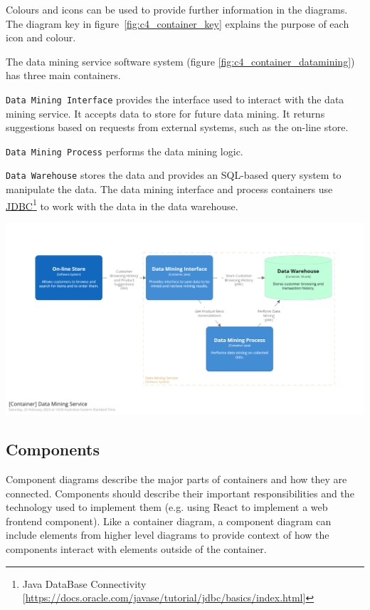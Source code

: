 Colours and icons can be used to provide further information in the diagrams.
The diagram key in figure~\ref{fig:c4_container_key} explains the purpose of each icon and colour.

The data mining service software system (figure \ref{fig:c4_container_datamining}) has three main containers.

\texttt{Data Mining Interface} provides the interface used to interact with the data mining service.
It accepts data to store for future data mining.
It returns suggestions based on requests from external systems, such as the on-line store.

\texttt{Data Mining Process} performs the data mining logic.

\texttt{Data Warehouse} stores the data and provides an SQL-based query system to manipulate the data.
The data mining interface and process containers use
\href{https://docs.oracle.com/javase/tutorial/jdbc/basics/index.html}{JDBC}\footnote{Java DataBase Connectivity [\url{https://docs.oracle.com/javase/tutorial/jdbc/basics/index.html}]}
to work with the data in the data warehouse.

\begin{center}
    \begin{adjustwidth}{-5mm}{-5mm}
        \includegraphics[trim=185 185 185 185,clip,width=0.92\paperwidth]{images/c4/datamining_container_diagram.png}
    \end{adjustwidth}
    \label{fig:c4_container_datamining}
\end{center}

\subsection{Components}
Component diagrams describe the major parts of containers and how they are connected.
Components should describe their important responsibilities and the technology used to implement them
(e.g. using React to implement a web frontend component).
Like a container diagram, a component diagram can include elements from higher level diagrams
to provide context of how the components interact with elements outside of the container.

